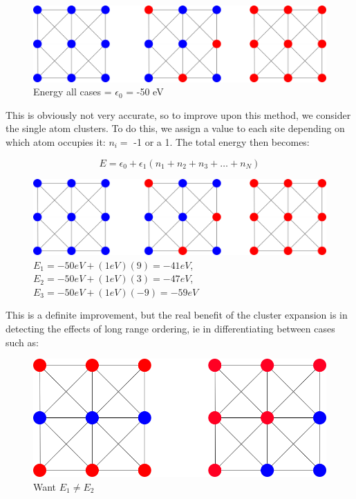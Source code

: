 \documentclass[12pt]{article}
\begin{document}
\begin{figure}[H]
	\centering
	\includegraphics[scale=0.5]{./images/triplet.png}
	\caption*{Energy all cases = $\epsilon_0$ = -50 eV}
\end{figure}

This is obviously not very accurate, so to improve upon this method, we consider the single atom clusters.  To do this, we assign a value to each site depending on which atom occupies it: $n_i=$ -1 or a 1. The total energy then becomes: 

\[
E = \epsilon_0 + \epsilon_1 (n_1 + n_2 +n_3 + \dots + n_N )
\]


\begin{figure}[H]
	\centering
	\includegraphics[scale=0.5]{./images/triplet.png}
	\caption*{$E_1 =-50eV + (1eV)(9) = -41 eV$, $E_2 = -50eV+ (1eV)(3) = -47eV$, $E_3 = -50 eV + (1eV)(-9) = -59eV$}
\end{figure}

This is a definite improvement, but the real benefit of the cluster expansion is in detecting the effects of long range ordering, ie in differentiating between cases such as:

\begin{figure}[H]
	\centering
	\includegraphics[scale=0.5]{./images/ordered.png}
	\caption*{Want $E_1\neq E_2$}
\end{figure}
\end{document}
